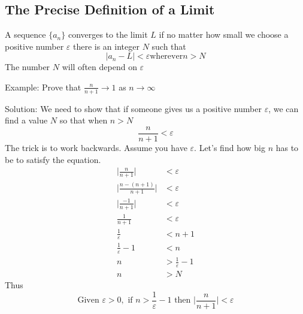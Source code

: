 \documentclass[12pt]{article}
\begin{document}
\subsection*{The Precise Definition of a Limit}
A sequence $\{a_n\}$ converges to the limit $L$ if no matter how small we choose a positive number $\varepsilon$ there is an integer $N$ such that \[ |a_n-L| < \varepsilon \text{wherever} n > N \] The number $N$ will often depend on $\varepsilon$

Example: Prove that $\frac{n}{n+1} \to 1$ as $n \to\infty$

Solution: We need to show that if someone gives us a positive number $\varepsilon$, we can find a value $N$ so that when $n>N$ \[ \frac{n}{n+1} < \varepsilon \] The trick is to work backwards. Assume you have $\varepsilon$. Let's find how big $n$ has to be to satisfy the equation.
\begin{align*}
\bigg|\frac{n}{n+1}\bigg| &< \varepsilon\\
\bigg|\frac{n-(n+1)}{n+1}\bigg| &< \varepsilon\\
\bigg|\frac{-1}{n+1}\bigg| &< \varepsilon\\
\frac{1}{n+1} &< \varepsilon\\
\frac{1}{\varepsilon} &< n+1\\
\frac{1}{\varepsilon} - 1 &< n\\
n &> \frac{1}{\varepsilon} - 1\\
n &> N
\end{align*}
Thus \[ \text{Given } \varepsilon > 0, \text{ if } n > \frac{1}{\varepsilon} - 1 \text{ then } \bigg|\frac{n}{n+1}\bigg| < \varepsilon \]
\end{document}
